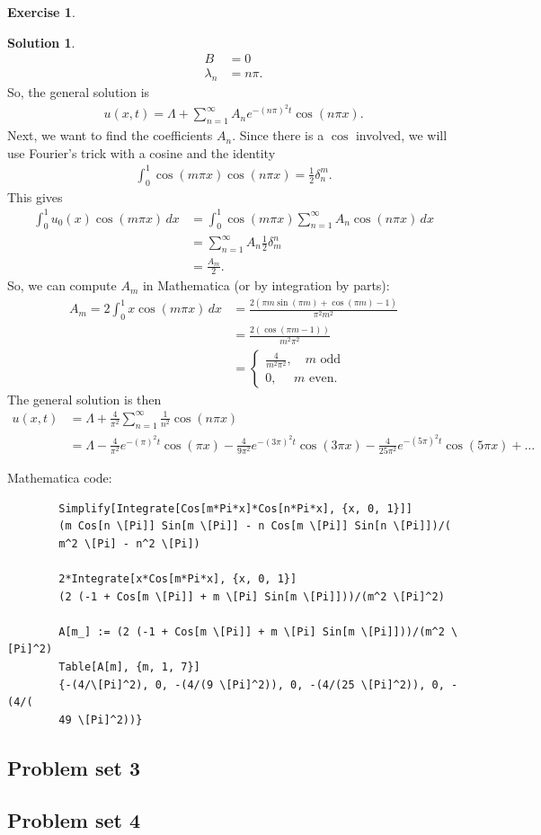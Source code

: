 \documentclass{article}
\theoremstyle{definition}
\newtheorem*{exer*}{Exercise}
\newtheorem*{sln*}{Solution}
\begin{document}
\begin{exer*}
\begin{sln*}
\begin{align*}
		B&= 0\\
		\lambda_n &= n\pi.
		\end{align*}
		So, the general solution is
		\begin{align*}
		u(x,t) = \Lambda + \sum_{n=1}^\infty A_n e^{-(n\pi)^2 t}\cos(n\pi x).
		\end{align*}
		Next, we want to find the coefficients $A_n$. Since there is a $\cos$ involved, we will use Fourier's trick with a cosine and the identity
		\begin{align*}
		\int_{0}^1\cos(m\pi x)\cos(n\pi x) = \frac{1}{2}\delta^m_n.
		\end{align*}
		This gives
		\begin{align*}
		\int_{0}^1 u_0(x)\cos(m\pi x)\,dx &= \int_{0}^1 \cos(m\pi x)\sum_{n=1}^\infty A_n \cos(n\pi x)\,dx\\
		&= \sum_{n=1}^\infty A_n \frac{1}{2}\delta^n_m\\
		&= \frac{A_m}{2}.
		\end{align*}
		So, we can compute $A_m$ in Mathematica (or by integration by parts):
		\begin{align*}
		A_m = 2\int_{0}^1 x\cos(m\pi x)\,dx &= \frac{2 (\pi  m \sin (\pi  m)+\cos (\pi  m)-1)}{\pi ^2 m^2}\\
		&= \frac{2(\cos(\pi m - 1))}{m^2\pi^2}\\
		&= \begin{cases}
		\frac{4}{m^2\pi^2},\,\,\,\,\,\, m \text{ odd}\\
		0,\,\,\,\,\,\,\,\, m \text{ even}.
		\end{cases}
		\end{align*}
		The general solution is then
		\begin{align*}
		u(x,t) &= \Lambda + \frac{4}{\pi^2}\sum_{n=1}^\infty \frac{1}{n^2}\cos(n\pi x)\\
		&= \Lambda -\frac{4}{\pi ^2}e^{-(\pi)^2 t}\cos(\pi x)    -\frac{4}{9 \pi ^2}e^{-(3\pi)^2 t}\cos(3\pi x)        -\frac{4}{25 \pi ^2}e^{-(5\pi)^2 t}\cos(5\pi x) + \dots
		\end{align*}
		
		\noindent Mathematica code:
		\begin{lstlisting}
		Simplify[Integrate[Cos[m*Pi*x]*Cos[n*Pi*x], {x, 0, 1}]]
		(m Cos[n \[Pi]] Sin[m \[Pi]] - n Cos[m \[Pi]] Sin[n \[Pi]])/(
		m^2 \[Pi] - n^2 \[Pi])
		
		2*Integrate[x*Cos[m*Pi*x], {x, 0, 1}]
		(2 (-1 + Cos[m \[Pi]] + m \[Pi] Sin[m \[Pi]]))/(m^2 \[Pi]^2)
		
		A[m_] := (2 (-1 + Cos[m \[Pi]] + m \[Pi] Sin[m \[Pi]]))/(m^2 \[Pi]^2)
		Table[A[m], {m, 1, 7}]
		{-(4/\[Pi]^2), 0, -(4/(9 \[Pi]^2)), 0, -(4/(25 \[Pi]^2)), 0, -(4/(
		49 \[Pi]^2))}
		\end{lstlisting}
	\end{sln*}
\end{exer*}


\newpage
\subsection{Problem set 3}

\newpage
\subsection{Problem set 4}
\end{document}
